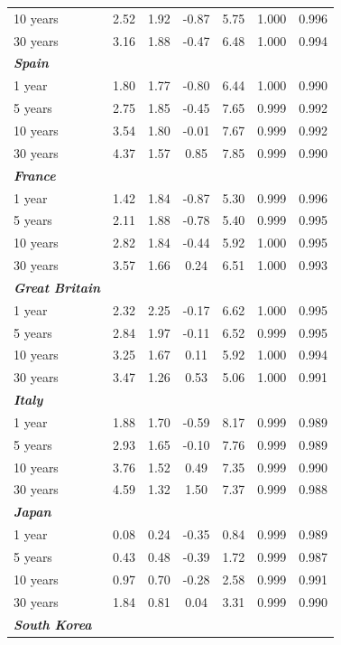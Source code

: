 \documentclass[12pt,bibliography=totoc]{article}
\begin{document}
\begin{appendices}
\begin{table}[H]
\begin{tabular}{l c c c c c c}
10 years	&	2.52	&	1.92	&	-0.87	&	5.75	&	1.000	&	0.996	\\
30 years	&	3.16	&	1.88	&	-0.47	&	6.48	&	1.000	&	0.994	\\
\textit{\textbf{Spain}}	&		&		&		&		&		&		\\
1 year	&	1.80	&	1.77	&	-0.80	&	6.44	&	1.000	&	0.990	\\
5 years	&	2.75	&	1.85	&	-0.45	&	7.65	&	0.999	&	0.992	\\
10 years	&	3.54	&	1.80	&	-0.01	&	7.67	&	0.999	&	0.992	\\
30 years	&	4.37	&	1.57	&	0.85	&	7.85	&	0.999	&	0.990	\\
\textit{\textbf{France}}	&		&		&		&		&		&		\\
1 year	&	1.42	&	1.84	&	-0.87	&	5.30	&	0.999	&	0.996	\\
5 years	&	2.11	&	1.88	&	-0.78	&	5.40	&	0.999	&	0.995	\\
10 years	&	2.82	&	1.84	&	-0.44	&	5.92	&	1.000	&	0.995	\\
30 years	&	3.57	&	1.66	&	0.24	&	6.51	&	1.000	&	0.993	\\
\textit{\textbf{Great Britain}}	&		&		&		&		&		&		\\
1 year	&	2.32	&	2.25	&	-0.17	&	6.62	&	1.000	&	0.995	\\
5 years	&	2.84	&	1.97	&	-0.11	&	6.52	&	0.999	&	0.995	\\
10 years	&	3.25	&	1.67	&	0.11	&	5.92	&	1.000	&	0.994	\\
30 years	&	3.47	&	1.26	&	0.53	&	5.06	&	1.000	&	0.991	\\
\textit{\textbf{Italy}}	&		&		&		&		&		&		\\
1 year	&	1.88	&	1.70	&	-0.59	&	8.17	&	0.999	&	0.989	\\
5 years	&	2.93	&	1.65	&	-0.10	&	7.76	&	0.999	&	0.989	\\
10 years	&	3.76	&	1.52	&	0.49	&	7.35	&	0.999	&	0.990	\\
30 years	&	4.59	&	1.32	&	1.50	&	7.37	&	0.999	&	0.988	\\
\textit{\textbf{Japan}}	&		&		&		&		&		&		\\
1 year	&	0.08	&	0.24	&	-0.35	&	0.84	&	0.999	&	0.989	\\
5 years	&	0.43	&	0.48	&	-0.39	&	1.72	&	0.999	&	0.987	\\
10 years	&	0.97	&	0.70	&	-0.28	&	2.58	&	0.999	&	0.991	\\
30 years	&	1.84	&	0.81	&	0.04	&	3.31	&	0.999	&	0.990\\
\textit{\textbf{South Korea}}	&		&		&		&		&		&		\\

\end{tabular}
\end{table}
\end{appendices}
\end{document}
